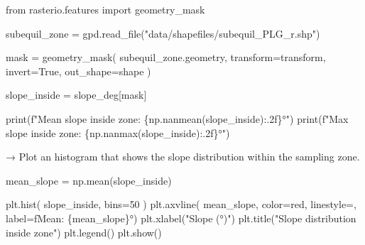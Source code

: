 \documentclass[
  letterpaper,
  DIV=11,
  numbers=noendperiod]{scrartcl}
\newenvironment{Shaded}{\begin{snugshade}}{\end{snugshade}}
\newcommand{\BuiltInTok}[1]{\textcolor[rgb]{0.00,0.23,0.31}{#1}}
\newcommand{\DecValTok}[1]{\textcolor[rgb]{0.68,0.00,0.00}{#1}}
\newcommand{\ImportTok}[1]{\textcolor[rgb]{0.00,0.46,0.62}{#1}}
\newcommand{\NormalTok}[1]{\textcolor[rgb]{0.00,0.23,0.31}{#1}}
\newcommand{\OperatorTok}[1]{\textcolor[rgb]{0.37,0.37,0.37}{#1}}
\newcommand{\SpecialCharTok}[1]{\textcolor[rgb]{0.37,0.37,0.37}{#1}}
\newcommand{\SpecialStringTok}[1]{\textcolor[rgb]{0.13,0.47,0.30}{#1}}
\newcommand{\StringTok}[1]{\textcolor[rgb]{0.13,0.47,0.30}{#1}}
\newcommand{\VariableTok}[1]{\textcolor[rgb]{0.07,0.07,0.07}{#1}}
\begin{document}
\begin{Shaded}
\begin{Highlighting}[]
\ImportTok{from}\NormalTok{ rasterio.features }\ImportTok{import}\NormalTok{ geometry\_mask}

\NormalTok{subequil\_zone }\OperatorTok{=}\NormalTok{ gpd.read\_file(}\StringTok{"data/shapefiles/subequil\_PLG\_r.shp"}\NormalTok{)}

\NormalTok{mask }\OperatorTok{=}\NormalTok{ geometry\_mask(}
\NormalTok{    subequil\_zone.geometry,}
\NormalTok{    transform}\OperatorTok{=}\NormalTok{transform,}
\NormalTok{    invert}\OperatorTok{=}\VariableTok{True}\NormalTok{,}
\NormalTok{    out\_shape}\OperatorTok{=}\NormalTok{shape}
\NormalTok{)}

\NormalTok{slope\_inside }\OperatorTok{=}\NormalTok{ slope\_deg[mask]}

\BuiltInTok{print}\NormalTok{(}\SpecialStringTok{f"Mean slope inside zone: }\SpecialCharTok{\{}\NormalTok{np}\SpecialCharTok{.}\NormalTok{nanmean(slope\_inside)}\SpecialCharTok{:.2f\}}\SpecialStringTok{°"}\NormalTok{)}
\BuiltInTok{print}\NormalTok{(}\SpecialStringTok{f"Max slope inside zone:  }\SpecialCharTok{\{}\NormalTok{np}\SpecialCharTok{.}\NormalTok{nanmax(slope\_inside)}\SpecialCharTok{:.2f\}}\SpecialStringTok{°"}\NormalTok{)}
\end{Highlighting}
\end{Shaded}

→ Plot an histogram that shows the slope distribution within the
sampling zone.

\begin{Shaded}
\begin{Highlighting}[]
\NormalTok{mean\_slope }\OperatorTok{=}\NormalTok{ np.mean(slope\_inside)}

\NormalTok{plt.hist(}
\NormalTok{    slope\_inside,}
\NormalTok{    bins}\OperatorTok{=}\DecValTok{50}
\NormalTok{)}
\NormalTok{plt.axvline(}
\NormalTok{    mean\_slope,}
\NormalTok{    color}\OperatorTok{=}\StringTok{\textquotesingle{}red\textquotesingle{}}\NormalTok{,}
\NormalTok{    linestyle}\OperatorTok{=}\StringTok{\textquotesingle{}{-}{-}\textquotesingle{}}\NormalTok{,}
\NormalTok{    label}\OperatorTok{=}\SpecialStringTok{f\textquotesingle{}Mean: }\SpecialCharTok{\{}\NormalTok{mean\_slope}\SpecialCharTok{\}}\SpecialStringTok{°\textquotesingle{}}\NormalTok{)}
\NormalTok{plt.xlabel(}\StringTok{"Slope (°)"}\NormalTok{)}
\NormalTok{plt.title(}\StringTok{"Slope distribution inside zone"}\NormalTok{)}
\NormalTok{plt.legend()}
\NormalTok{plt.show()}
\end{Highlighting}
\end{Shaded}
\end{document}
